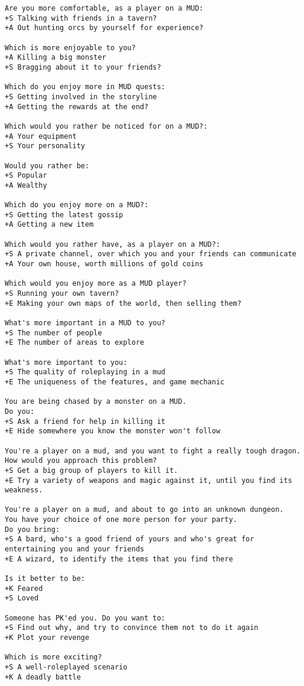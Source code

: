 \begin{verbatim}
Are you more comfortable, as a player on a MUD:
+S Talking with friends in a tavern?
+A Out hunting orcs by yourself for experience?

Which is more enjoyable to you?
+A Killing a big monster
+S Bragging about it to your friends?

Which do you enjoy more in MUD quests:
+S Getting involved in the storyline
+A Getting the rewards at the end?

Which would you rather be noticed for on a MUD?:
+A Your equipment
+S Your personality

Would you rather be:
+S Popular
+A Wealthy

Which do you enjoy more on a MUD?:
+S Getting the latest gossip
+A Getting a new item

Which would you rather have, as a player on a MUD?:
+S A private channel, over which you and your friends can communicate
+A Your own house, worth millions of gold coins

Which would you enjoy more as a MUD player?
+S Running your own tavern?
+E Making your own maps of the world, then selling them?

What's more important in a MUD to you?
+S The number of people
+E The number of areas to explore

What's more important to you:
+S The quality of roleplaying in a mud
+E The uniqueness of the features, and game mechanic

You are being chased by a monster on a MUD.
Do you:
+S Ask a friend for help in killing it
+E Hide somewhere you know the monster won't follow

You're a player on a mud, and you want to fight a really tough dragon.
How would you approach this problem?
+S Get a big group of players to kill it.
+E Try a variety of weapons and magic against it, until you find its weakness.

You're a player on a mud, and about to go into an unknown dungeon.
You have your choice of one more person for your party.
Do you bring:
+S A bard, who's a good friend of yours and who's great for entertaining you and your friends
+E A wizard, to identify the items that you find there

Is it better to be:
+K Feared
+S Loved

Someone has PK'ed you. Do you want to:
+S Find out why, and try to convince them not to do it again
+K Plot your revenge

Which is more exciting?
+S A well-roleplayed scenario
+K A deadly battle


\end{verbatim}
